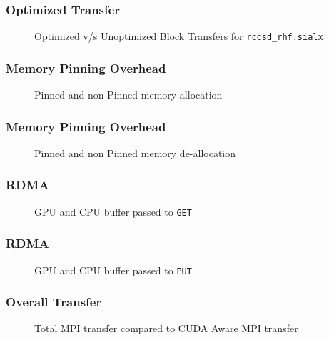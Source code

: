 \documentclass{beamer}
\begin{document}
\begin{frame}[fragile]
  \frametitle{Optimized Transfer}
  \pause
  \begin{figure}[h]
    \resizebox{.9\linewidth}{!}{}
    \caption{Optimized v/s Unoptimized Block Transfers for \texttt{rccsd\_rhf.sialx}}
  \end{figure}
\end{frame}

\begin{frame}[fragile]
  \frametitle{Memory Pinning Overhead}
  \pause
  \begin{figure}[h]
    \resizebox{.9\linewidth}{!}{}
    \caption{Pinned and non Pinned memory allocation}
  \end{figure}
\end{frame}

\begin{frame}[fragile]
  \frametitle{Memory Pinning Overhead}
  \pause
  \begin{figure}[h]
    \resizebox{.9\linewidth}{!}{}
    \caption{Pinned and non Pinned memory de-allocation}
  \end{figure}
\end{frame}

\begin{frame}[fragile]
  \frametitle{RDMA}
  \pause
  \begin{figure}[h]
    \resizebox{.9\linewidth}{!}{}
    \caption{GPU and CPU buffer passed to \texttt{GET}}
  \end{figure}
\end{frame}

\begin{frame}[fragile]
  \frametitle{RDMA}
  \pause
  \begin{figure}[h]
    \resizebox{.9\linewidth}{!}{}
    \caption{GPU and CPU buffer passed to \texttt{PUT}}
  \end{figure}
\end{frame}

\begin{frame}[fragile]
  \frametitle{Overall Transfer}
  \pause
  \begin{figure}[h]
    \resizebox{.9\linewidth}{!}{}
    \caption{Total MPI transfer compared to CUDA Aware MPI transfer}
  \end{figure}
\end{frame}
\end{document}
